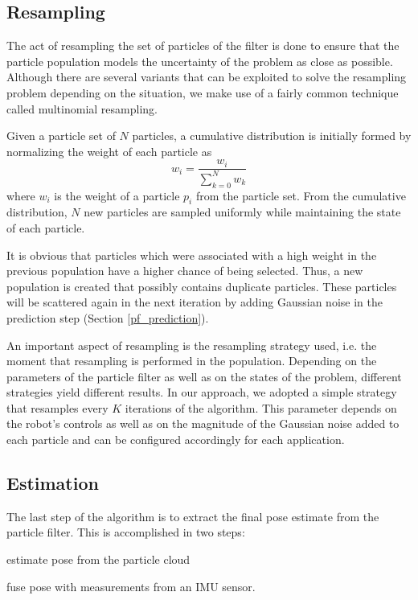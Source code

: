 \subsection{Resampling}

The act of resampling the set of particles of the filter is done
to ensure that the particle population models the
uncertainty of the problem as close as possible.
Although there are several variants that can be exploited to solve the
resampling problem depending on the situation, we make use of a fairly
common technique called multinomial resampling.

Given a particle set of $N$ particles, a cumulative distribution is
initially formed by normalizing the weight of each particle as
\begin{equation}
    w_i = \frac{w_i}{\sum\limits_{k=0}^N w_k}
\end{equation}
where $w_i$ is the weight of a particle $p_i$ from the particle set.
From the cumulative distribution, $N$ new particles are sampled
uniformly while maintaining the state of each particle.

It is obvious that particles which were associated with a high
weight in the previous population have a higher chance of being selected.
Thus, a new population is created that possibly contains duplicate
particles.
These particles will be scattered again in the next iteration by
adding Gaussian noise in the prediction step (Section \ref{pf_prediction}).

An important aspect of resampling is the resampling strategy used,
i.e. the moment that resampling is performed in the population.
Depending on the parameters of the particle filter as well as on the
states of the problem, different strategies yield different results.
In our approach, we adopted a simple strategy that resamples every
$K$ iterations of the algorithm.
This parameter depends on the robot's controls as well as on the magnitude of
the Gaussian noise added to each particle and can be configured
accordingly for each application.

\subsection{Estimation}

The last step of the algorithm is to extract the final pose estimate from
the particle filter. This is accomplished in two steps:
\begin{enumerate*}[label=(\roman*)]
    \item estimate pose from the particle cloud
    \item fuse pose with measurements from an IMU sensor.
\end{enumerate*}

